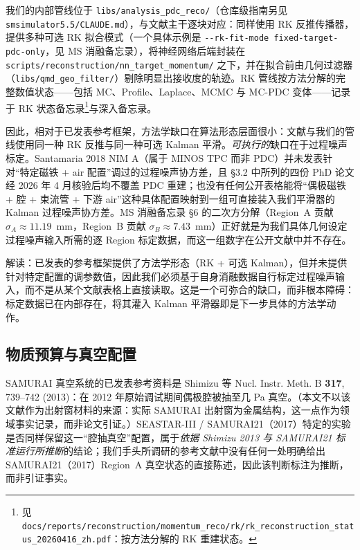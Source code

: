 \documentclass[a4paper, 11pt]{article}
\begin{document}
我们的内部管线位于 \texttt{libs/analysis\_pdc\_reco/}（仓库级指南另见 \texttt{smsimulator5.5/CLAUDE.md}），与文献主干逐块对应：同样使用 RK 反推传播器，提供多种可选 RK 拟合模式（一个具体示例是 \texttt{-{}-rk-fit-mode fixed-target-pdc-only}，见 MS 消融备忘录），将神经网络后端封装在 \texttt{scripts/reconstruction/nn\_target\_momentum/} 之下，并在拟合前由几何过滤器（\texttt{libs/qmd\_geo\_filter/}）剔除明显出接收度的轨迹。RK 管线按方法分解的完整数值状态——包括 MC、Profile、Laplace、MCMC 与 MC-PDC 变体——记录于 RK 状态备忘录\footnote{\label{fn:rkstatus}见 \texttt{docs/reports/reconstruction/momentum\_reco/rk/rk\_reconstruction\_status\_20260416\_zh.pdf}：按方法分解的 RK 重建状态。}与深入备忘录。

因此，相对于已发表参考框架，方法学缺口在算法形态层面很小：文献与我们的管线使用同一种 RK 反推与同一种可选 Kalman 平滑。\emph{可执行的}缺口在于过程噪声标定。Santamaria 2018 NIM A（属于 MINOS TPC 而非 PDC）并未发表针对“特定磁铁 + air 配置”调过的过程噪声协方差，且 §3.2 中所列的四份 PhD 论文经 2026 年 4 月核验后均不覆盖 PDC 重建；也没有任何公开表格能将“偶极磁铁 + 腔 + 束流管 + 下游 air”这种具体配置映射到一组可直接装入我们平滑器的 Kalman 过程噪声协方差。MS 消融备忘录 §6 的二次方分解（Region~A 贡献 $\sigma_A \approx 11.19$~mm，Region~B 贡献 $\sigma_B \approx 7.43$~mm）正好就是为我们具体几何设定过程噪声输入所需的逐 Region 标定数据，而这一组数字在公开文献中并不存在。

解读：已发表的参考框架提供了方法学形态（RK + 可选 Kalman），但并未提供针对特定配置的调参数值，因此我们必须基于自身消融数据自行标定过程噪声输入，而不是从某个文献表格上直接读取。这是一个可弥合的缺口，而非根本障碍：标定数据已在内部存在，将其灌入 Kalman 平滑器即是下一步具体的方法学动作。
\subsection{物质预算与真空配置}
SAMURAI 真空系统的已发表参考资料是 Shimizu 等 Nucl. Instr. Meth. B \textbf{317}, 739--742 (2013)：在 2012 年原始调试期间偶极腔被抽至几 Pa 真空。（本文不以该文献作为出射窗材料的来源：实际 SAMURAI 出射窗为金属结构，这一点作为领域事实记录，而非论文引证。）SEASTAR-III / SAMURAI21（2017）特定的实验是否同样保留这一“腔抽真空”配置，属于\emph{依据 Shimizu 2013 与 SAMURAI21 标准运行所推断}的结论；我们手头所调研的参考文献中没有任何一处明确给出 SAMURAI21（2017）Region~A 真空状态的直接陈述，因此该判断标注为推断，而非引证事实。
\end{document}
